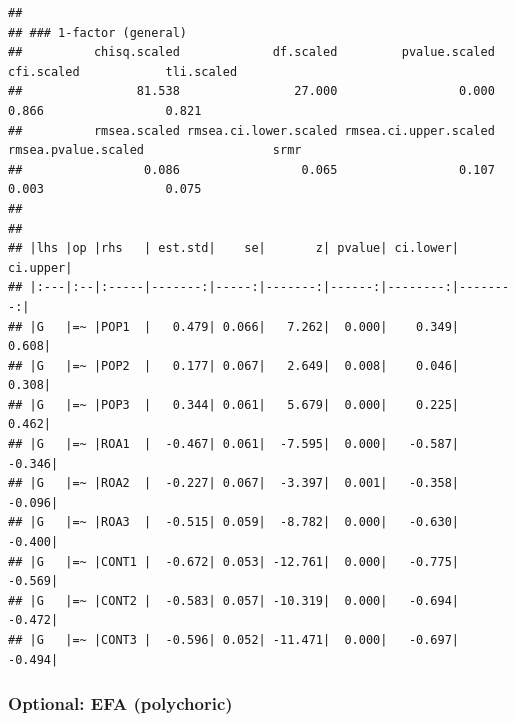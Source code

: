 \documentclass[
  10pt,
]{article}
\newenvironment{Shaded}{\begin{snugshade}}{\end{snugshade}}
\newcommand{\AttributeTok}[1]{\textcolor[rgb]{0.13,0.29,0.53}{#1}}
\newcommand{\DecValTok}[1]{\textcolor[rgb]{0.00,0.00,0.81}{#1}}
\newcommand{\FunctionTok}[1]{\textcolor[rgb]{0.13,0.29,0.53}{\textbf{#1}}}
\newcommand{\NormalTok}[1]{#1}
\newcommand{\OtherTok}[1]{\textcolor[rgb]{0.56,0.35,0.01}{#1}}
\newcommand{\SpecialCharTok}[1]{\textcolor[rgb]{0.81,0.36,0.00}{\textbf{#1}}}
\newcommand{\StringTok}[1]{\textcolor[rgb]{0.31,0.60,0.02}{#1}}
\begin{document}
\begin{verbatim}
##
## ### 1-factor (general)
##          chisq.scaled             df.scaled         pvalue.scaled            cfi.scaled            tli.scaled
##                81.538                27.000                 0.000                 0.866                 0.821
##          rmsea.scaled rmsea.ci.lower.scaled rmsea.ci.upper.scaled   rmsea.pvalue.scaled                  srmr
##                 0.086                 0.065                 0.107                 0.003                 0.075
##
##
## |lhs |op |rhs   | est.std|    se|       z| pvalue| ci.lower| ci.upper|
## |:---|:--|:-----|-------:|-----:|-------:|------:|--------:|--------:|
## |G   |=~ |POP1  |   0.479| 0.066|   7.262|  0.000|    0.349|    0.608|
## |G   |=~ |POP2  |   0.177| 0.067|   2.649|  0.008|    0.046|    0.308|
## |G   |=~ |POP3  |   0.344| 0.061|   5.679|  0.000|    0.225|    0.462|
## |G   |=~ |ROA1  |  -0.467| 0.061|  -7.595|  0.000|   -0.587|   -0.346|
## |G   |=~ |ROA2  |  -0.227| 0.067|  -3.397|  0.001|   -0.358|   -0.096|
## |G   |=~ |ROA3  |  -0.515| 0.059|  -8.782|  0.000|   -0.630|   -0.400|
## |G   |=~ |CONT1 |  -0.672| 0.053| -12.761|  0.000|   -0.775|   -0.569|
## |G   |=~ |CONT2 |  -0.583| 0.057| -10.319|  0.000|   -0.694|   -0.472|
## |G   |=~ |CONT3 |  -0.596| 0.052| -11.471|  0.000|   -0.697|   -0.494|
\end{verbatim}

\hypertarget{optional-efa-polychoric}{%
\subsubsection{Optional: EFA
(polychoric)}\label{optional-efa-polychoric}}

\begin{Shaded}
\end{Shaded}
\end{document}

